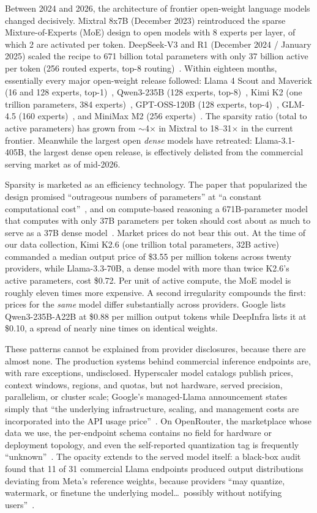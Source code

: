 \documentclass[11pt]{article}
\begin{document}
Between 2024 and 2026, the architecture of frontier open-weight language
models changed decisively. Mixtral 8x7B (December 2023) reintroduced the
sparse Mixture-of-Experts (MoE) design to open models with 8 experts per
layer, of which 2 are activated per token. DeepSeek-V3 and R1 (December 2024 /
January 2025) scaled the recipe to 671 billion total parameters with only 37
billion active per token (256 routed experts, top-8 routing)~\cite{r15}.
Within eighteen months, essentially every major open-weight release followed:
Llama 4 Scout and Maverick (16 and 128 experts,
top-1)~\cite{hf_scout,hf_maverick}, Qwen3-235B (128 experts,
top-8)~\cite{hf_qwen}, Kimi K2 (one trillion parameters, 384
experts)~\cite{hf_kimi}, GPT-OSS-120B (128 experts, top-4)~\cite{hf_oss},
GLM-4.5 (160 experts)~\cite{hf_glm}, and MiniMax M2 (256
experts)~\cite{hf_minimax}. The sparsity ratio (total to active parameters) has grown
from $\sim$4$\times$ in Mixtral to 18--31$\times$ in the current frontier.
Meanwhile the largest open \emph{dense} models have retreated: Llama-3.1-405B,
the largest dense open release, is effectively delisted from the commercial
serving market as of mid-2026.

Sparsity is marketed as an efficiency technology. The paper that popularized
the design promised ``outrageous numbers of parameters'' at ``a constant computational cost''~\cite{r30}, and on compute-based reasoning a
671B-parameter model that computes with only 37B parameters per token should
cost about as much to serve as a 37B dense model~\cite{r31,r32}. Market prices
do not bear this out. At the time of our data collection, Kimi K2.6 (one
trillion total parameters, 32B active) commanded a median output price of
\$3.55 per million tokens across twenty providers, while Llama-3.3-70B, a
dense model with more than twice K2.6's active parameters, cost \$0.72. Per
unit of active compute, the MoE model is roughly eleven times more
expensive. A second irregularity compounds the first: prices for the
\emph{same} model differ substantially across providers. Google lists
Qwen3-235B-A22B at \$0.88 per million output tokens while DeepInfra lists it
at \$0.10, a spread of nearly nine times on identical weights.

These patterns cannot be explained from provider disclosures, because there
are almost none. The production systems behind commercial inference endpoints
are, with rare exceptions, undisclosed. Hyperscaler model catalogs publish
prices, context windows, regions, and quotas, but not hardware, served
precision, parallelism, or cluster scale; Google's managed-Llama announcement
states simply that ``the underlying infrastructure, scaling, and management
costs are incorporated into the API usage price''~\cite{r25}. On OpenRouter,
the marketplace whose data we use, the per-endpoint schema contains no field
for hardware or deployment topology, and even the self-reported quantization
tag is frequently ``unknown''~\cite{r1}. The opacity extends to the served
model itself: a black-box audit found that 11 of 31 commercial Llama endpoints
produced output distributions deviating from Meta's reference weights, because
providers ``may quantize, watermark, or finetune the underlying
model\ldots\ possibly without notifying users''~\cite{r23}.
\end{document}
